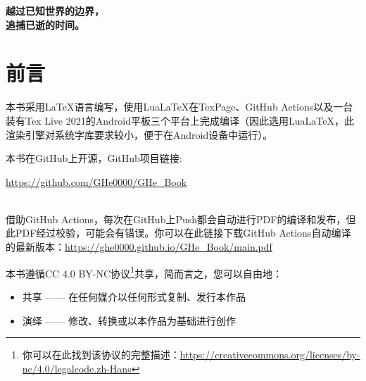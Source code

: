 \documentclass{gbook}
\begin{document}
\everymath{\displaystyle}

\setlength{\lineskip}{2.5pt}
\setlength{\lineskiplimit}{2.5pt}

 

\newpage

\thispagestyle{empty}
\vspace*{\fill}
\begin{center}
\Huge{\textbf{越过已知世界的边界，\\
追捕已逝的时间。}}
\end{center}
\vspace*{\fill}

\newpage


\setcounter{page}{1}

\section*{前言}


本书采用\LaTeX 语言编写，使用Lua\LaTeX 在TexPage、GitHub Actions以及一台装有Tex Live 2021的Android平板三个平台上完成编译（因此选用Lua\LaTeX，此渲染引擎对系统字库要求较小，便于在Android设备中运行）。
~\\

\begin{minipage}[b]{0.62\linewidth}
本书在GitHub上开源，GitHub项目链接:

\url{https://github.com/GHe0000/GHe_Book} 
\end{minipage}
\hfill
\begin{minipage}[b]{0.1\linewidth}
\end{minipage}
~\\

借助GitHub Actions，每次在GitHub上Push都会自动进行PDF的编译和发布，但此PDF经过校验，可能会有错误。你可以在此链接下载GitHub Actions自动编译的最新版本：\url{https://ghe0000.github.io/GHe_Book/main.pdf}

本书遵循CC 4.0 BY-NC协议\footnote{你可以在此找到该协议的完整描述：\url{https://creativecommons.org/licenses/by-nc/4.0/legalcode.zh-Hans}}共享，简而言之，您可以自由地：
\begin{itemize}
    \item 共享 —— 在任何媒介以任何形式复制、发行本作品
    \item 演绎 —— 修改、转换或以本作品为基础进行创作
\end{itemize}
\end{document}

